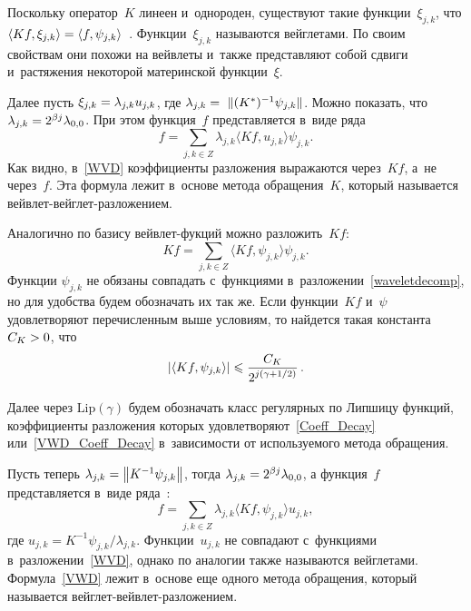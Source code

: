 \begin{multicols}{2}
Поскольку оператор~$K$ линеен и~однороден, существуют такие функции~$\xi_{j,k}$, 
что $\langle K f, \xi_{j,k}\rangle \hm= \langle f, \psi_{j,k}\rangle$~\cite{D94}. 
Функции~$\xi_{j,k}$ называются вейглетами. По своим свойствам они похожи на 
вейвлеты и~также представляют собой сдвиги и~растяжения некоторой материнской функции~$\xi$.

Далее пусть $\xi_{j,k}\hm = \lambda_{j,k} u_{j,k}$, где $\lambda_{j,k} \hm= \
\|{(K^*)^{-1} \psi_{j,k}}\|$. Можно показать, что $\lambda_{j,k}\hm=2^{\beta j}\lambda_{0,0}$.
При этом функция~$f$ представляется в~виде ряда
\begin{equation} 
\label{WVD}
f=\sum\limits_{j,k\in Z}\lambda_{j,k}\langle Kf,u_{j,k}\rangle\psi_{j,k}.
\end{equation}
Как видно, в~\eqref{WVD} коэффициенты разложения выражаются через~$Kf$, 
а~не через~$f$. Эта формула лежит в~основе метода обращения~$K$, который называется вейв\-лет-вейг\-лет-раз\-ло\-же\-ни\-ем.


Аналогично по базису вейвлет-фук\-ций можно разложить~$Kf$:
\begin{equation*}
Kf = \sum\limits_{j,k\in Z} \langle Kf,\psi_{j,k}\rangle \psi_{j,k}.
\end{equation*}
Функции $\psi_{j,k}$ не обязаны совпадать с~функциями в~разложении~\eqref{waveletdecomp}, 
но для удобства будем обозначать их так же. Если функции~$Kf$ и~$\psi$ 
удовлетворяют перечисленным выше условиям, то найдется такая константа $C_K\hm>0$, что
\begin{equation}                                                                           
\label{VWD_Coeff_Decay}
\left\vert\langle Kf,\psi_{j,k}\rangle\right\vert \leqslant \displaystyle\frac{\displaystyle C_K\mathstrut}{\displaystyle 2^{j \left(\gamma + 1/2 \right)}\mathstrut}\,.
\end{equation}

Далее через $\mathrm{Lip}(\gamma)$ будем обозначать класс регулярных по 
Липшицу функций, коэффициенты разложения которых удовлетворяют~\eqref{Coeff_Decay} 
или~\eqref{VWD_Coeff_Decay} в~зависимости от используемого метода обращения.


Пусть теперь $\lambda_{j,k} \hm= \norm{K^{-1}\psi_{j,k}}$, тогда $\lambda_{j,k} 
\hm= 2^{\beta j}\lambda_{0,0}$, а функция~$f$ представляется в~виде 
ряда~\cite{AS98}:
\begin{equation} 
\label{VWD}
f = \sum\limits_{j,k\in Z}\lambda_{j,k}\langle Kf,\psi_{j,k}\rangle u_{j,k},
\end{equation}
где $u_{j,k} = K^{-1}\psi_{j,k}/\lambda_{j,k}$. Функции~$u_{j,k}$ не совпадают 
с~функциями в~разложении~\eqref{WVD}, однако по аналогии также называются вейглетами. 
Формула~\eqref{VWD} лежит в~основе еще одного метода обращения, который 
называется вейг\-лет-вейв\-лет-раз\-ло\-же\-нием.


\end{multicols}
